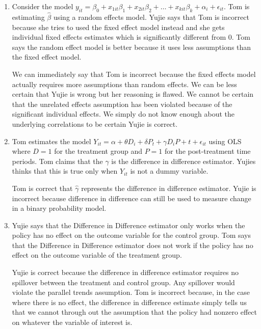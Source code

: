 \documentclass[11pt]{SelfArxOneColBMN}
\begin{document}
\begin{enumerate}
\begin{enumerate}
\begin{solution}
    \end{solution}
    \item Consider the model $y_{it} = \beta_0 + x_{1it}\beta_1 + x_{2it}\beta_2 + \ldots + x_{kit}\beta_k + \alpha_i + \epsilon_{it}$. Tom is estimating $\hat{\beta}$ using a random effects model. Yujie says that Tom is incorrect because she tries to used the fixed effect model instead and she gets individual fixed effects estimates which is significantly different from 0. Tom says the random effect model is better because it uses less assumptions than the fixed effect model.
    \begin{solution}
      We can immediately say that Tom is incorrect because the fixed effects model actually requires more assumptions than random effects. We can be less certain that Yujie is wrong but her reasoning is flawed. We cannot be certain that the unrelated effects assumption has been violated because of the significant individual effects. We simply do not know enough about the underlying correlations to be certain Yujie is correct. 
    \end{solution}
    \item Tom estimates the model $Y_{it} = \alpha + \theta D_i + \delta P_t + \gamma D_iP+t + \epsilon_{it}$ using OLS where $D = 1$ for the treatment group and $P = 1$ for the post-treatment time periods. Tom claims that the $\hat{\gamma}$ is the difference in difference estimator. Yujies thinks that this is true only when $Y_{it}$ is not a dummy variable.
    \begin{solution}
      Tom is correct that $\hat{\gamma}$ represents the difference in difference estimator. Yujie is incorrect because difference in difference can still be used to measure change in a binary probability model.
    \end{solution}
    \item Yujie says that the Difference in Difference estimator only works when the policy has no effect on the outcome variable for the control group. Tom says that the Difference in Difference estimator does not work if the policy has no effect on the outcome variable of the treatment group.
    \begin{solution}
      Yujie is correct because the difference in difference estimator requires no spillover between the treatment and control group. Any spillover would violate the parallel trends assumption. Tom is incorrect because, in the case where there is no effect, the difference in difference estimate simply tells us that we cannot through out the assumption that the policy had nonzero effect on whatever the variable of interest is. 

\end{solution}
\end{enumerate}
\end{enumerate}
\end{document}
